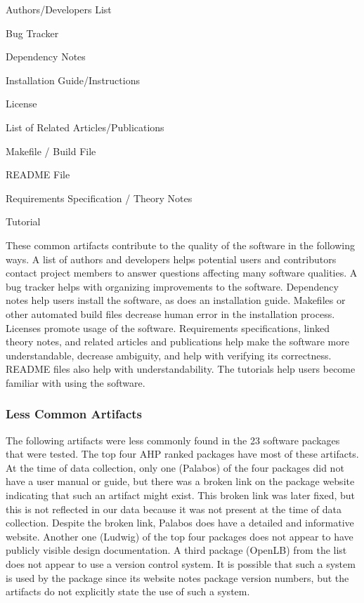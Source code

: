 \documentclass[12pt, notitlepage]{article}
\begin{document}
\begin{multicols}{2}	
\begin{itemize}
\end{itemize}
\end{multicols}


These common artifacts contribute to the quality of the software in the following ways. A list of authors and developers helps potential users and contributors contact project members to answer questions affecting many software qualities. A bug tracker helps with organizing improvements to the software. Dependency notes help users install the software, as does an installation guide. Makefiles or other automated build files decrease human error in the installation process. Licenses promote usage of the software. Requirements specifications, linked theory notes, and related articles and publications help make the software more understandable, decrease ambiguity, and help with verifying its correctness. README files also help with understandability. The tutorials help users become familiar with using the software.


\subsubsection{Less Common Artifacts}\label{lesscommon}
The following artifacts were less commonly found in the 23 software packages that were tested. The top four AHP ranked packages have most of these artifacts.
At the time of data collection, only one (Palabos) of the four packages did not have a user manual or guide, but there was a broken link on the package website indicating that such an artifact might exist. This broken link was later fixed, but this is not reflected in our data because it was not present at the time of data collection. Despite the broken link, Palabos does have a detailed and informative website. Another one (Ludwig) of the top four packages does not appear to have publicly visible design documentation. A third package (OpenLB) from the list does not appear to use a version control system. It is possible that such a system is used by the package since its website notes package version numbers, but the artifacts do not explicitly state the use of such a system.
\end{document}

